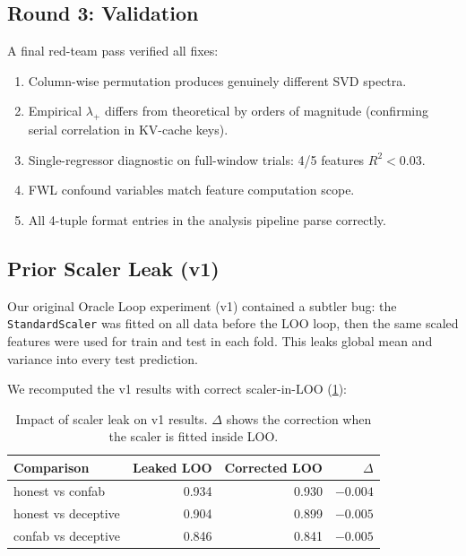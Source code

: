 \subsection{Round 3: Validation}

A final red-team pass verified all fixes:

\begin{enumerate}[nosep]
  \item Column-wise permutation produces genuinely different SVD spectra.
  \item Empirical $\lambda_+$ differs from theoretical by orders of
    magnitude (confirming serial correlation in KV-cache keys).
  \item Single-regressor diagnostic on full-window trials: 4/5 features
    $R^2 < 0.03$.
  \item FWL confound variables match feature computation scope.
  \item All 4-tuple format entries in the analysis pipeline parse
    correctly.
\end{enumerate}

\subsection{Prior Scaler Leak (v1)}

Our original Oracle Loop experiment (v1) contained a subtler bug:
the \texttt{StandardScaler} was fitted on all data before the LOO loop,
then the same scaled features were used for train and test in each fold.
This leaks global mean and variance into every test prediction.

We recomputed the v1 results with correct scaler-in-LOO
(\cref{tab:scaler_leak}):

\begin{table}[H]
\centering
\caption{Impact of scaler leak on v1 results. $\Delta$ shows the
  correction when the scaler is fitted inside LOO.}
\label{tab:scaler_leak}
\begin{tabular}{lrrr}
\toprule
Comparison & Leaked LOO & Corrected LOO & $\Delta$ \\
\midrule
honest vs confab       & 0.934 & 0.930 & $-0.004$ \\
honest vs deceptive    & 0.904 & 0.899 & $-0.005$ \\
confab vs deceptive    & 0.846 & 0.841 & $-0.005$ \\
\bottomrule
\end{tabular}
\end{table}

